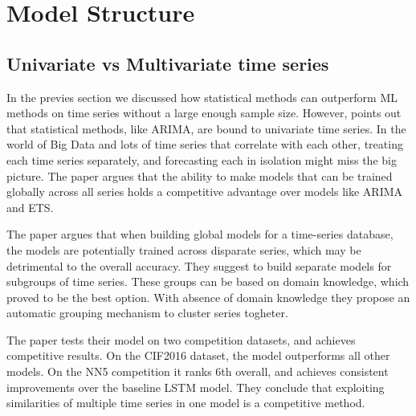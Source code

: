 
\section{Model Structure}





\subsection{Univariate vs Multivariate time series}
In the previes section we discussed how statistical methods can outperform ML methods on
time series without a large enough sample size.
However, \cite{Bandara2017} points out that statistical methods, like ARIMA, are bound to
univariate time series. In the world of Big Data and lots of time series that correlate with each other,
treating each time series separately, and forecasting each in isolation might miss the big picture.
The paper argues that the ability to make models that can be trained globally across all series
holds a competitive advantage over models like ARIMA and ETS.

The paper argues that when building global models for a time-series database, the models are
potentially trained across disparate series, which may be detrimental to the overall accuracy.
They suggest to build separate models for subgroups of time series.
These groups can be based on domain knowledge, which proved to be the best option. With absence of 
domain knowledge they propose an automatic grouping mechanism to cluster series togheter.

The paper tests their model on two competition datasets, and achieves competitive results.
On the CIF2016 dataset, the model outperforms all other models.
On the NN5 competition it ranks 6th overall, and achieves consistent improvements over the baseline LSTM model.
They conclude that exploiting similarities of multiple time series in one model
is a competitive method.

